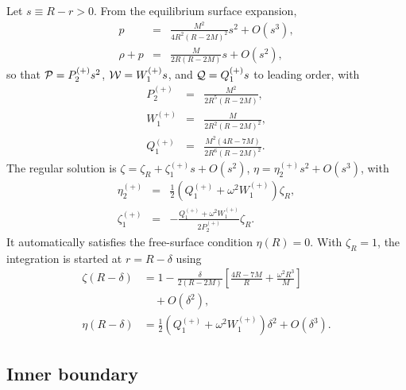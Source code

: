\documentclass[%
 reprint,
 amsmath,amssymb,
 aps,prd,
 superscriptaddress,
]{revtex4-2}
\begin{document}
Let $s\equiv R-r>0$. From the equilibrium surface expansion,
\begin{eqnarray}
    p &=& \frac{M^2}{4R^2(R-2M)^2}s^2+O(s^3),\nonumber\\
    \rho+p &=& \frac{M}{2R(R-2M)}s+O(s^2),
\end{eqnarray}
so that ${\cal P} = P_2^{(+)}s^2$, ${\cal W} = W_1^{(+)}s$, and ${\cal Q} = Q_1^{(+)}s$ to leading order, with
\begin{eqnarray}
    P_2^{(+)} &=& \frac{M^2}{2R^5(R-2M)},\nonumber\\
    W_1^{(+)} &=& \frac{M}{2R^2(R-2M)^2},\nonumber\\
    Q_1^{(+)} &=& \frac{M^2(4R-7M)}{2R^6(R-2M)^2}.
    \label{eq:outercoeffs}
\end{eqnarray}
The regular solution is $\zeta = \zeta_R+\zeta_1^{(+)}s+O(s^2)$, $\eta = \eta_2^{(+)}s^2+O(s^3)$, with
\begin{eqnarray}
    \eta_2^{(+)} &=& \frac{1}{2}\left(Q_1^{(+)}+\omega^2W_1^{(+)}\right)\zeta_R ,\nonumber\\
    \zeta_1^{(+)} &=& -\frac{Q_1^{(+)}+\omega^2W_1^{(+)}}{2P_2^{(+)}}\zeta_R .
\end{eqnarray}
It automatically satisfies the free-surface condition $\eta(R)=0$. With $\zeta_R=1$, the integration is started at $r=R-\delta$ using
\begin{align}
    \zeta(R-\delta) &= 1-\frac{\delta}{2(R-2M)}\left[\frac{4R-7M}{R}+\frac{\omega^2R^3}{M}\right]\nonumber\\
    &\quad+O(\delta^2),
    \label{eq:zeta_outer_bc}\\
    \eta(R-\delta) &= \frac{1}{2}\left(Q_1^{(+)}+\omega^2W_1^{(+)}\right)\delta^2+O(\delta^3).
    \label{eq:eta_outer_bc}
\end{align}

\subsection{Inner boundary}
\end{document}
